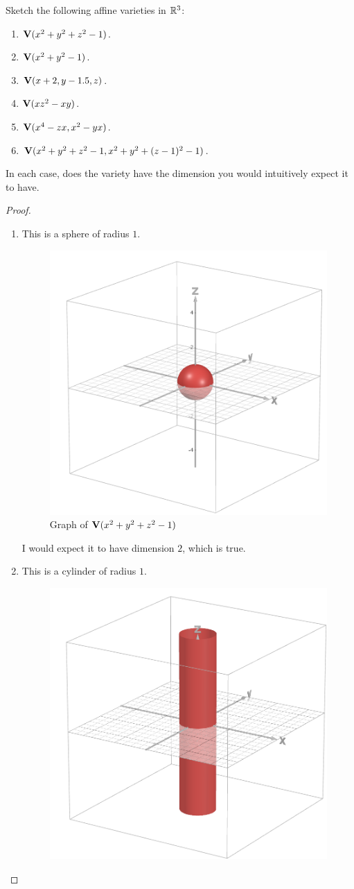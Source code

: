 \begin{exercise}{4}
Sketch the following affine varieties in $\mathbb{R}^3$:
\begin{enumerate}
    \item $\mathbf{V}(x^2 + y^2 + z^2 - 1)$.
    \item $\mathbf{V}(x^2 + y^2 - 1)$.
    \item $\mathbf{V}(x+2, y-1.5, z)$.
    \item $\mathbf{V}(xz^2 - xy)$.
    \item $\mathbf{V}(x^4 - zx, x^2 - yx)$.
    \item $\mathbf{V}(x^2 + y^2 + z^2 - 1, x^2 + y^2 + (z-1)^2 - 1)$.
\end{enumerate}
In each case, does the variety have the dimension you would intuitively expect it to have.
\end{exercise}
\begin{proof}
    \begin{enumerate}
        \item This is a sphere of radius $1$.
        \begin{figure}[H]
            \centering
            \includegraphics[width=0.5\linewidth]{cox-little-oshea/ch1/assets/sec1-2-ex4a.png}
            \caption{Graph of $\mathbf{V}(x^2+y^2+z^2-1)$}
            \label{fig:sec1-2-ex4a}
        \end{figure}
        I would expect it to have dimension $2$, which is true.
        \item This is a cylinder of radius $1$.
        \begin{figure}[H]
            \centering
            \includegraphics[width=0.5\linewidth]{cox-little-oshea/ch1/assets/sec1-2-ex4b.png}

\end{figure}
\end{enumerate}
\end{proof}
